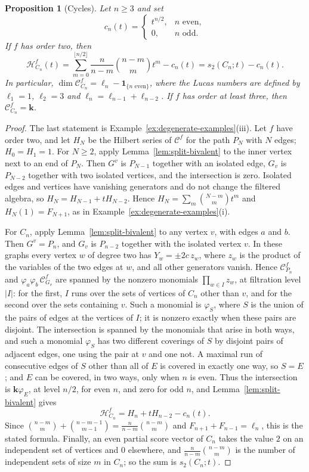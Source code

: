 \documentclass[reqno]{article}
\theoremstyle{plain} %
\newtheorem{proposition}[theorem]{Proposition}
\theoremstyle{definition}
\theoremstyle{remark}
\newcommand{\K} {\mathbf{k}}
\newcommand {\CC}{\mathscr{C}}
\newcommand{\hs}{\mathscr{H}}
\numberwithin{equation}{section}
\begin{document}
\begin{proposition}[Cycles]\label{prop:degenerate-cycles}
Let $n\ge3$ and set
\[
 c_n(t)=\begin{cases}t^{n/2},&n\text{ even},\\0,&n\text{ odd}.\end{cases}
\]
If $f$ has order two, then
\[
 \hs_{C_n}^f(t)=
 \sum_{m=0}^{\lfloor n/2\rfloor}\frac{n}{n-m}\binom{n-m}{m}t^m-c_n(t)
 =s_2(C_n;t)-c_n(t).
\]
In particular, $\dim\CC_{C_n}^f=\ell_n-\mathbf1_{\{n\text{ even}\}}$,
where the Lucas numbers are defined by $\ell_1=1$, $\ell_2=3$ and
$\ell_n=\ell_{n-1}+\ell_{n-2}$. If $f$ has order at least three, then $\CC_{C_n}^f=\K$.
\end{proposition}
\begin{proof}
The last statement is Example~\ref{ex:degenerate-examples}(iii). Let $f$
have order two, and let $H_N$ be the Hilbert series of $\CC^f$ for the
path $P_N$ with $N$ edges; $H_0=H_1=1$. For $N\ge2$, apply
Lemma~\ref{lem:split-bivalent} to the inner vertex next to an end of
$P_N$. Then $G^v$ is $P_{N-1}$ together with an isolated edge, $G_v$ is
$P_{N-2}$ together with two isolated vertices, and the intersection is
zero. Isolated edges and vertices have vanishing generators and do not
change the filtered algebra, so $H_N=H_{N-1}+tH_{N-2}$. Hence $H_N=\sum_m\binom{N-m}{m}t^m$ and
$H_N(1)=F_{N+1}$, as in Example~\ref{ex:degenerate-examples}(i).

For $C_n$, apply Lemma~\ref{lem:split-bivalent} to any vertex $v$, with
edges $a$ and $b$. Then $G^v=P_n$, and $G_v$ is $P_{n-2}$ together with
the isolated vertex $v$. In these graphs every vertex $w$ of degree two
has $Y_w=\pm2c\,z_w$, where $z_w$ is the product of the variables of the
two edges at $w$, and all other generators vanish. Hence $\CC^f_{P_n}$
and $\varphi_a\varphi_b\,\CC^f_{G_v}$ are spanned by the nonzero
monomials $\prod_{w\in I}z_w$, at filtration level $|I|$: for the first,
$I$ runs over the sets of vertices of $C_n$ other than $v$, and for the
second over the sets containing $v$. Such a monomial is $\varphi_S$,
where $S$ is the union of the pairs of edges at the vertices of $I$; it
is nonzero exactly when these pairs are disjoint. The intersection is
spanned by the monomials that arise in both ways, and such a monomial
$\varphi_S$ has two different coverings of $S$ by disjoint pairs of
adjacent edges, one using the pair at $v$ and one not. A maximal run of
consecutive edges of $S$ other than all of $E$ is covered in exactly one
way, so $S=E$; and $E$ can be covered, in two ways, only when $n$ is
even. Thus
the intersection is $\K\varphi_E$, at level $n/2$, for even $n$, and
zero for odd $n$, and Lemma~\ref{lem:split-bivalent} gives
\[
 \hs_{C_n}^f=H_n+tH_{n-2}-c_n(t).
\]
Since $\binom{n-m}{m}+\binom{n-m-1}{m-1}=\frac{n}{n-m}\binom{n-m}{m}$ and
$F_{n+1}+F_{n-1}=\ell_n$, this is the stated formula. Finally, an even
partial score vector of $C_n$ takes the value $2$ on an independent set
of vertices and $0$ elsewhere, and $\frac{n}{n-m}\binom{n-m}{m}$ is the
number of independent sets of size $m$ in $C_n$; so the sum is
$s_2(C_n;t)$.
\end{proof}
\end{document}

